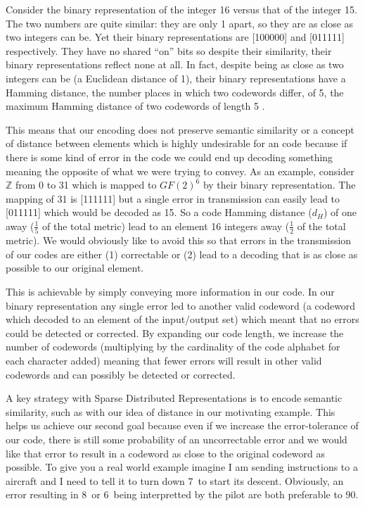 \documentclass[oneside,12pt,openany]{book}
\begin{document}
	Consider the binary representation of the integer 16 versus that of the integer 15. The two numbers are quite similar: they are only 1 apart, so they are as close as two integers can be. Yet their binary representations are [100000] and [011111] respectively. They have no shared ``on'' bits so despite their similarity, their binary representations reflect none at all. In fact, despite being as close as two integers can be (a Euclidean distance of 1), their binary representations have a Hamming distance, the number places in which two codewords differ, of 5, the maximum Hamming distance of two codewords of length 5 \cite{Adams}. 
	
	This means that our encoding does not preserve semantic similarity or a concept of distance between elements which is highly undesirable for an code because if there is some kind of error in the code we could end up decoding something meaning the opposite of what we were trying to convey. As an example, consider $\mathbb{Z}$ from 0 to 31 which is mapped to $GF(2)^{6}$ by their binary representation. The mapping of 31 is [111111] but a single error in transmission can easily lead to [011111] which would be decoded as 15. So a code Hamming distance ($d_{H}$) of one away ($\frac{1}{5}$ of the total metric) lead to an element 16 integers away ($\frac{1}{2}$ of the total metric). We would obviously like to avoid this so that errors in the transmission of our codes are either (1) correctable or (2) lead to a decoding that is as close as possible to our original element.
	
	This is achievable by simply conveying more information in our code. In our binary representation any single error led to another valid codeword (a codeword which decoded to an element of the input/output set) which meant that no errors could be detected or corrected. By expanding our code length, we increase the number of codewords (multiplying by the cardinality of the code alphabet for each character added) meaning that fewer errors will result in other valid codewords and can possibly be detected or corrected. 
	
	A key strategy with Sparse Distributed Representations is to encode semantic similarity, such as with our idea of distance in our motivating example. This helps us achieve our second goal because even if we increase the error-tolerance of our code, there is still some probability of an uncorrectable error and we would like that error to result in a codeword as close to the original codeword as possible. To give you a real world example imagine I am sending instructions to a aircraft and I need to tell it to turn down 7\textdegree~to start its descent. Obviously, an error resulting in 8\textdegree~or 6\textdegree~being interpretted by the pilot are both preferable to 90\textdegree.
	
\end{document}
